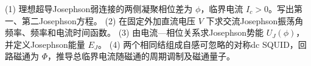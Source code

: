 (1) 理想超导Josephson弱连接的两侧凝聚相位差为 \(\phi\)，临界电流 \(I_c>0\)。写出第一、第二Josephson方程。
(2) 在固定外加直流电压 \(V\) 下求交流Josephson振荡角频率、频率和电流时间函数。
(3) 由电流—相位关系求Josephson势能 \(U_J(\phi)\)，并定义Josephson能量 \(E_J\)。
(4) 两个相同结组成自感可忽略的对称dc SQUID，回路磁通为 \(\Phi\)，推导总临界电流随磁通的周期调制及磁通量子。
